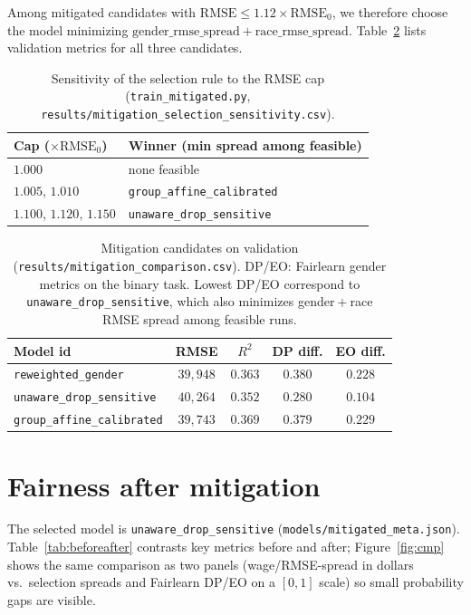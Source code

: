 \documentclass[sigconf,nonacm]{acmart}
\begin{document}
Among mitigated candidates with $\mathrm{RMSE}\le 1.12\times \mathrm{RMSE}_0$, we therefore choose the model minimizing $\mathrm{gender\_rmse\_spread}+\mathrm{race\_rmse\_spread}$.
Table~\ref{tab:mitcompare} lists validation metrics for all three candidates.

\begin{table}[h]
\centering
\small
\begin{tabular}{l l}
\toprule
Cap ($\times\mathrm{RMSE}_0$) & Winner (min spread among feasible) \\
\midrule
$1.000$ & none feasible \\
$1.005$, $1.010$ & \texttt{group\_affine\_calibrated} \\
$1.100$, $1.120$, $1.150$ & \texttt{unaware\_drop\_sensitive} \\
\bottomrule
\end{tabular}
\caption{Sensitivity of the selection rule to the RMSE cap (\texttt{train\_mitigated.py}, \texttt{results/mitigation\_selection\_sensitivity.csv}).}
\label{tab:selection_sens}
\end{table}

\begin{table}[h]
\centering
\small
\begin{tabular}{lcccc}
\toprule
Model id & RMSE & $R^2$ & DP diff. & EO diff. \\
\midrule
\texttt{reweighted\_gender} & $39{,}948$ & $0.363$ & $0.380$ & $0.228$ \\
\texttt{unaware\_drop\_sensitive} & $40{,}264$ & $0.352$ & $\mathbf{0.280}$ & $\mathbf{0.104}$ \\
\texttt{group\_affine\_calibrated} & $39{,}743$ & $0.369$ & $0.379$ & $0.229$ \\
\bottomrule
\end{tabular}
\caption{Mitigation candidates on validation (\texttt{results/mitigation\_comparison.csv}). DP/EO: Fairlearn gender metrics on the binary task. Lowest DP/EO correspond to \texttt{unaware\_drop\_sensitive}, which also minimizes gender${}+$race RMSE spread among feasible runs.}
\label{tab:mitcompare}
\end{table}

\section{Fairness after mitigation}

The selected model is \texttt{unaware\_drop\_sensitive} (\texttt{models/mitigated\_meta.json}).
Table~\ref{tab:beforeafter} contrasts key metrics before and after; Figure~\ref{fig:cmp} shows the same comparison as two panels (wage/RMSE-spread in dollars vs.\ selection spreads and Fairlearn DP/EO on a $[0,1]$ scale) so small probability gaps are visible.
\end{document}
